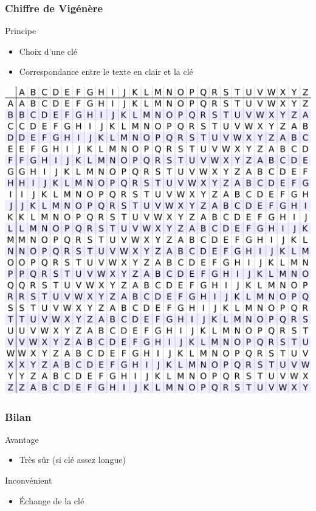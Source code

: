 \documentclass[xcolor={dvipsnames}]{beamer}
\begin{document}
\begin{frame}
\frametitle{Chiffre de Vigénère}

\begin{block}{Principe}
	\begin{itemize}
		\item Choix d'une clé
		\item Correspondance entre le texte en clair et la clé
	\end{itemize}
	
	\begin{center}
		\includegraphics[scale=0.08]{vigenere}
	\end{center}
\end{block}
\end{frame}

\begin{frame}
	\frametitle{Bilan}
	
	\begin{exampleblock}{Avantage}
		\begin{itemize}
			\item Très sûr (si clé assez longue)			
		\end{itemize}
	\end{exampleblock}
	
	\begin{alertblock}{Inconvénient}
		\begin{itemize}
			\item \'Echange de la clé
		\end{itemize}
	\end{alertblock}
	
\end{frame}
\end{document}
